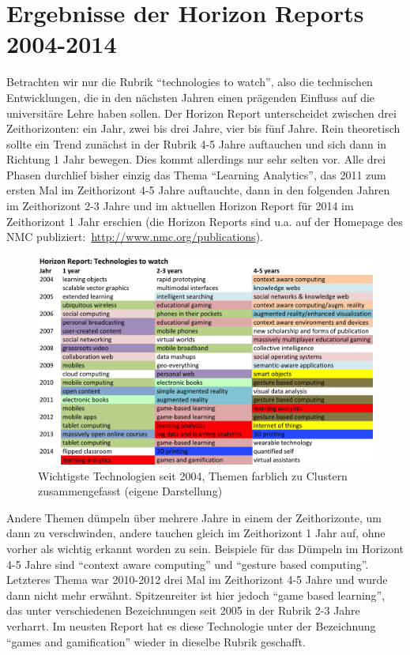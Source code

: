 \documentclass[a4paper,
fontsize=11pt,
oneside,
numbers=noperiodatend,
parskip=half-,
bibliography=totoc,
final
]{scrartcl}
\begin{document}
\section*{Ergebnisse der Horizon Reports
2004-2014}\label{ergebnisse-der-horizon-reports-2004-2014}

Betrachten wir nur die Rubrik \enquote{technologies to watch}, also die
technischen Entwicklungen, die in den nächsten Jahren einen prägenden
Einfluss auf die universitäre Lehre haben sollen. Der Horizon Report
unterscheidet zwischen drei Zeithorizonten: ein Jahr, zwei bis drei
Jahre, vier bis fünf Jahre. Rein theoretisch sollte ein Trend zunächst
in der Rubrik 4-5 Jahre auftauchen und sich dann in Richtung 1 Jahr
bewegen. Dies kommt allerdings nur sehr selten vor. Alle drei Phasen
durchlief bisher einzig das Thema \enquote{Learning Analytics}, das 2011
zum ersten Mal im Zeithorizont 4-5 Jahre auftauchte, dann in den
folgenden Jahren im Zeithorizont 2-3 Jahre und im aktuellen Horizon
Report für 2014 im Zeithorizont 1 Jahr erschien (die Horizon Reports
sind u.a. auf der Homepage des NMC
publiziert:~\url{http://www.nmc.org/publications}).~

\begin{figure}[htbp]
\centering
\includegraphics{./img/02-Themen_Horizon.png}
\caption{Wichtigste Technologien seit 2004, Themen farblich zu Clustern
zusammengefasst (eigene Darstellung)}
\end{figure}

Andere Themen dümpeln über mehrere Jahre in einem der Zeithorizonte, um
dann zu verschwinden, andere tauchen gleich im Zeithorizont 1 Jahr auf,
ohne vorher als wichtig erkannt worden zu sein. Beispiele für das
Dümpeln im Horizont 4-5 Jahre sind \enquote{context aware computing} und
\enquote{gesture based computing}. Letzteres Thema war 2010-2012 drei
Mal im Zeithorizont 4-5 Jahre und wurde dann nicht mehr erwähnt.
Spitzenreiter ist hier jedoch \enquote{game based learning}, das unter
verschiedenen Bezeichnungen seit 2005 in der Rubrik 2-3 Jahre verharrt.
Im neusten Report hat es diese Technologie unter der Bezeichnung
\enquote{games and gamification} wieder in dieselbe Rubrik geschafft.
\end{document}
